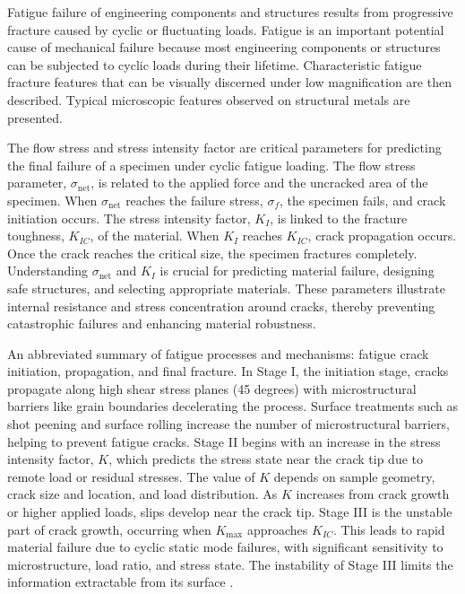 \documentclass{ieeeaccess}
\begin{document}
Fatigue failure of engineering components and structures results from progressive fracture caused by cyclic or fluctuating loads. Fatigue is an important potential cause of mechanical failure because most engineering components or structures can be subjected to cyclic loads during their lifetime.
Characteristic fatigue fracture features that can be visually discerned under low magnification are then described.
Typical microscopic features observed on structural metals are presented.

The flow stress and stress intensity factor are critical parameters for predicting the final failure of a specimen under cyclic fatigue loading. The flow stress parameter, \(\sigma_{\text{net}}\), is related to the applied force and the uncracked area of the specimen. When \(\sigma_{\text{net}}\) reaches the failure stress, \(\sigma_f\), the specimen fails, and crack initiation occurs. The stress intensity factor, \(K_I\), is linked to the fracture toughness, \(K_{IC}\), of the material. When \(K_I\) reaches \(K_{IC}\), crack propagation occurs. Once the crack reaches the critical size, the specimen fractures completely. Understanding \(\sigma_{\text{net}}\) and \(K_I\) is crucial for predicting material failure, designing safe structures, and selecting appropriate materials. These parameters illustrate internal resistance and stress concentration around cracks, thereby preventing catastrophic failures and enhancing material robustness.

An abbreviated summary of fatigue processes and mechanisms: fatigue crack initiation, propagation, and final fracture.
In Stage I, the initiation stage, cracks propagate along high shear stress planes (45 degrees) with microstructural barriers like grain boundaries decelerating the process. Surface treatments such as shot peening and surface rolling increase the number of microstructural barriers, helping to prevent fatigue cracks. Stage II begins with an increase in the stress intensity factor, \(K\), which predicts the stress state near the crack tip due to remote load or residual stresses. The value of \(K\) depends on sample geometry, crack size and location, and load distribution. As \(K\) increases from crack growth or higher applied loads, slips develop near the crack tip. Stage III is the unstable part of crack growth, occurring when \(K_{\text{max}}\) approaches \(K_{IC}\). This leads to rapid material failure due to cyclic static mode failures, with significant sensitivity to microstructure, load ratio, and stress state. The instability of Stage III limits the information extractable from its surface \cite{newman1981empirical}.
\end{document}
